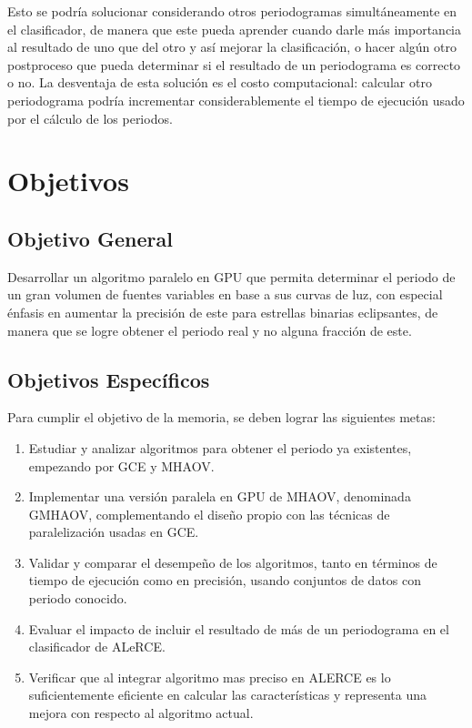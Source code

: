 \begin{enumerate}
    Esto se podría solucionar considerando otros periodogramas simultáneamente en el clasificador, de manera que este pueda aprender cuando darle más importancia al resultado de uno que del otro y así mejorar la clasificación, o hacer algún otro postproceso que pueda determinar si el resultado de un periodograma es correcto o no. La desventaja de esta solución es el costo computacional: calcular otro periodograma podría incrementar considerablemente el tiempo de ejecución usado por el cálculo de los periodos.
\end{enumerate}
\section{Objetivos}\label{sec:objetivos}
  \subsection*{Objetivo General}\label{sec:obj-g}
  Desarrollar un algoritmo paralelo en GPU que permita determinar el periodo de un gran volumen de fuentes variables en base a sus curvas de luz, con especial énfasis en aumentar la precisión de este para estrellas binarias eclipsantes, de manera que se logre obtener el periodo real y no alguna fracción de este.

  \subsection*{Objetivos Específicos}\label{sec:obj-e}
  Para cumplir el objetivo de la memoria, se deben lograr las siguientes metas:
  \begin{enumerate}
  \item Estudiar y analizar algoritmos para obtener el periodo ya existentes, empezando por GCE y MHAOV.
  \item Implementar una versión paralela en GPU de MHAOV, denominada GMHAOV, complementando el diseño propio con las técnicas de paralelización usadas en GCE.
  \item Validar y comparar el desempeño de los algoritmos, tanto en términos de tiempo de ejecución como en precisión, usando conjuntos de datos con periodo conocido.
  \item Evaluar el impacto de incluir el resultado de más de un periodograma  en el clasificador de ALeRCE.
  \item Verificar que al integrar algoritmo mas preciso  en ALERCE es lo suficientemente eficiente en calcular las características y representa una mejora con respecto al algoritmo actual.
  \end{enumerate}
